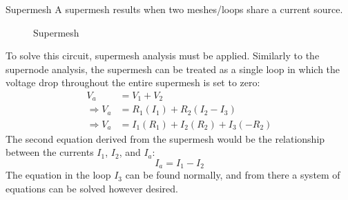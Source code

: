 \documentclass[12pt]{article}
\begin{document}
\begin{definition}{Supermesh}
  A supermesh results when two meshes/loops share a current source.
\end{definition}

\begin{figure}[H]
  \centering
  
  \caption{Supermesh}
  \label{fig:033}
\end{figure}

To solve this circuit, supermesh analysis must be applied. Similarly to the supernode analysis, the supermesh can be treated as a single loop in which the voltage drop throughout the entire {\color{ma} supermesh} is set to zero:
\begin{align*}
  V_a             &= V_1 + V_2 \\
  \Rightarrow V_a &= R_1(I_1) + R_2(I_2 - I_3) \\
  \Rightarrow V_a &= I_1(R_1) + I_2(R_2) + I_3(-R_2)
\end{align*}
The second equation derived from the supermesh would be the relationship between the currents $I_1$, $I_2$, and $I_a$:
\begin{equation*}
  I_a = I_1 - I_2
\end{equation*}
The equation in the loop $I_3$ can be found normally, and from there a system of equations can be solved however desired.
\end{document}
